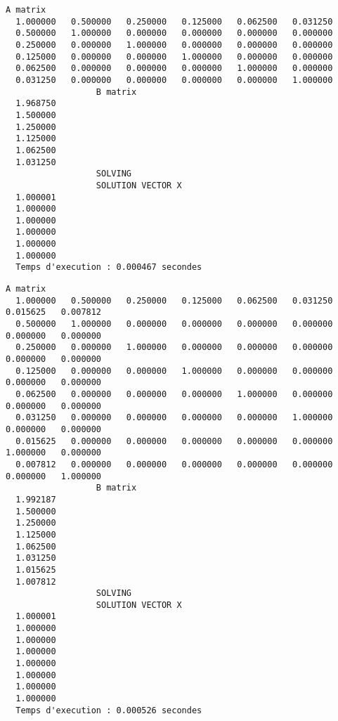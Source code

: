 \documentclass{report}
\begin{document}
\begin{lstlisting}[caption={$A_6X=B$} results, basicstyle=\fontsize{8}{10}\selectfont]
                  A matrix
  1.000000   0.500000   0.250000   0.125000   0.062500   0.031250   
  0.500000   1.000000   0.000000   0.000000   0.000000   0.000000   
  0.250000   0.000000   1.000000   0.000000   0.000000   0.000000   
  0.125000   0.000000   0.000000   1.000000   0.000000   0.000000   
  0.062500   0.000000   0.000000   0.000000   1.000000   0.000000   
  0.031250   0.000000   0.000000   0.000000   0.000000   1.000000   
                  B matrix
  1.968750   
  1.500000   
  1.250000   
  1.125000   
  1.062500   
  1.031250   
                  SOLVING
                  SOLUTION VECTOR X 
  1.000001   
  1.000000   
  1.000000   
  1.000000   
  1.000000   
  1.000000   
  Temps d'execution : 0.000467 secondes
\end{lstlisting}
\begin{lstlisting}[caption={$A_7X=B$} results, basicstyle=\fontsize{5}{8}\selectfont]
                  A matrix
  1.000000   0.500000   0.250000   0.125000   0.062500   0.031250   0.015625   0.007812   
  0.500000   1.000000   0.000000   0.000000   0.000000   0.000000   0.000000   0.000000   
  0.250000   0.000000   1.000000   0.000000   0.000000   0.000000   0.000000   0.000000   
  0.125000   0.000000   0.000000   1.000000   0.000000   0.000000   0.000000   0.000000   
  0.062500   0.000000   0.000000   0.000000   1.000000   0.000000   0.000000   0.000000   
  0.031250   0.000000   0.000000   0.000000   0.000000   1.000000   0.000000   0.000000   
  0.015625   0.000000   0.000000   0.000000   0.000000   0.000000   1.000000   0.000000   
  0.007812   0.000000   0.000000   0.000000   0.000000   0.000000   0.000000   1.000000   
                  B matrix
  1.992187   
  1.500000   
  1.250000   
  1.125000   
  1.062500   
  1.031250   
  1.015625   
  1.007812   
                  SOLVING
                  SOLUTION VECTOR X 
  1.000001   
  1.000000   
  1.000000   
  1.000000   
  1.000000   
  1.000000   
  1.000000   
  1.000000   
  Temps d'execution : 0.000526 secondes
\end{lstlisting}
\end{document}
